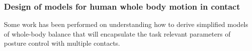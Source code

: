 \documentclass[final,5p,twocolumn]{elsarticle}
\begin{document}


\subsubsection{Design of models for human whole body motion in contact}
Some work has been performed on understanding how to derive simplified models of whole-body balance that will encapsulate the task relevant parameters of posture control with multiple contacts. 
\end{document}
